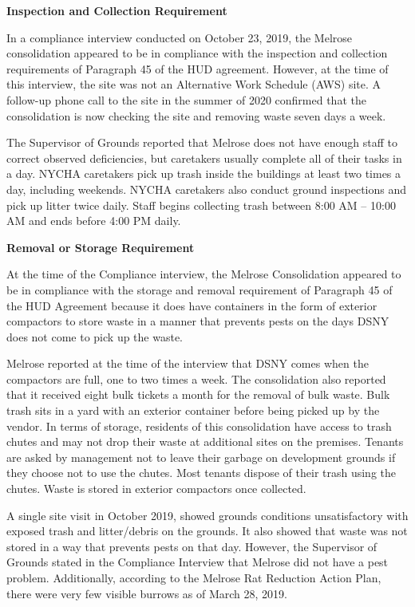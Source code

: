 

\textbf{Inspection and Collection Requirement}

In a compliance interview conducted on October 23, 2019, the Melrose consolidation appeared to be in compliance with the inspection and collection requirements of Paragraph 45 of the HUD agreement. However, at the time of this interview, the site was not an Alternative Work Schedule (AWS) site. A follow-up phone call to the site in the summer of 2020 confirmed that the consolidation is now checking the site and removing waste seven days a week.

The Supervisor of Grounds reported that Melrose does not have enough staff to correct observed deficiencies, but caretakers usually complete all of their tasks in a day. NYCHA caretakers pick up trash inside the buildings at least two times a day, including weekends. NYCHA caretakers also conduct ground inspections and pick up litter twice daily. Staff begins collecting trash between 8:00 AM -- 10:00 AM and ends before 4:00 PM daily.

\textbf{Removal or Storage Requirement}

At the time of the Compliance interview, the Melrose Consolidation appeared to be in compliance with the storage and removal requirement of Paragraph 45 of the HUD Agreement because it does have containers in the form of exterior compactors to store waste in a manner that prevents pests on the days DSNY does not come to pick up the waste.

Melrose reported at the time of the interview that DSNY comes when the compactors are full, one to two times a week. The consolidation also reported that it received eight bulk tickets a month for the removal of bulk waste. Bulk trash sits in a yard with an exterior container before being picked up by the vendor. In terms of storage, residents of this consolidation have access to trash chutes and may not drop their waste at additional sites on the premises. Tenants are asked by management not to leave their garbage on development grounds if they choose not to use the chutes. Most tenants dispose of their trash using the chutes. Waste is stored in exterior compactors once collected.

A single site visit in October 2019, showed grounds conditions unsatisfactory with exposed trash and litter/debris on the grounds. It also showed that waste was not stored in a way that prevents pests on that day. However, the Supervisor of Grounds stated in the Compliance Interview that Melrose did not have a pest problem. Additionally, according to the  Melrose Rat Reduction Action Plan, there were very few visible burrows as of March 28, 2019.

